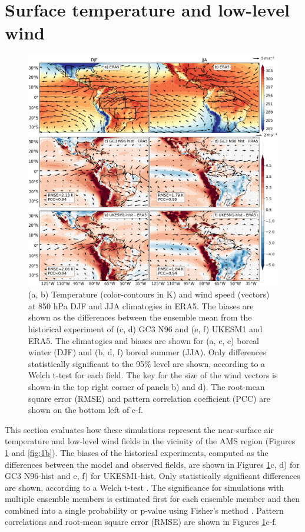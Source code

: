 \section{Surface temperature and low-level wind} \label{sq:clim}

 \begin{figure}[t!]
\centering
 \includegraphics[width=\linewidth]{figures/fig1p2_f1a.png}
\caption[Temperature and SLP climatologies in UKESM1 and HadGEM3]{ (a, b) Temperature (color-contours in K) and wind speed (vectors) at 850 hPa DJF and JJA climatogies in ERA5. The biases are shown as the differences between the ensemble mean from the historical experiment of (c, d) GC3 N96 and  (e, f) UKESM1 and ERA5.
The climatogies and biases are shown for (a, c, e) boreal winter (DJF) and (b, d, f) boreal summer (JJA). Only differences statistically significant to the 95\% level are shown, according to a Welch t-test for each field. The key for the size of the wind vectors is shown in the top right corner of panels b) and d). The root-mean square error (RMSE) and pattern correlation coefficient (PCC) are shown on the bottom left of c-f.}
\label{fig:1}
\end{figure}


This section evaluates how these simulations represent the near-surface air temperature and low-level wind fields in the vicinity of the AMS region (Figures \ref{fig:1} and \ref{fig:1b}). %
The biases of the historical experiments, computed as the differences between the model and observed fields, are shown in Figures \ref{fig:1}c, d) for GC3 N96-hist and e, f) for UKESM1-hist.
 Only statistically significant differences are shown, according to a Welch t-test \citep{wilks2011}. The significance for simulations with multiple ensemble members is estimated first for each ensemble member and then combined into a single probability or p-value using Fisher's method \citep{fisher1992statistical}. Pattern correlations and root-mean square error (RMSE) are shown in Figures \ref{fig:1}c-f. %
 


